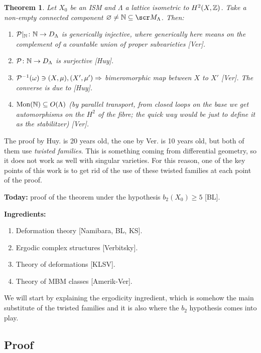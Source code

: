 \documentclass[A4paper, british, reqno]{amsart}
\theoremstyle{darkgreentheorem}
\newtheorem{thm}{Theorem}[section]
\theoremstyle{darkbluedefinition}
\theoremstyle{darkredexample}
\theoremstyle{remark}
\newcommand{\1}{\mathbbm{1}}
\newcommand{\sub}{\subseteq}
\begin{document}
\begin{thm}
    Let $X_{0}$ be an ISM and $\Lambda$ a lattice isometric to $H^{2}(X,\mathbb{Z})$.
    Take a non-empty connected component $\varnothing \neq \N\sub \M_{\Lambda}$.
    Then:
    \begin{enumerate}
	\item $\mathcal{P}|_{\mathbb{N}}\colon \mathbb{N}\to D_{\Lambda}$ is \textit{generically} injective, where generically here means on the complement of a countable union of proper subvarieties [Ver].
	\item $\mathcal{P}\colon \mathbb{N}\to D_{\Lambda}$ is surjective [Huy].
	\item $\mathcal{P}^{-1}(\omega)\ni (X,\mu),(X',\mu') \Rightarrow $ bimeromorphic map between $X$ to $X'$ [Ver].
	    The converse is due to [Huy].
	\item $\operatorname{Mon}(\N)\sub O(\Lambda)$ (by parallel transport, from closed loops on the base we get automorphisms on the $H^{2}$ of the fibre; the quick way would be just to define it as the stabilitzer) [Ver].
    \end{enumerate}
\end{thm}

The proof by Huy. is 20 years old, the one by Ver. is 10 years old, but both of them use \textit{twisted families}.
This is something coming from differential geometry, so it does not work as well with singular varieties.
For this reason, one of the key points of this work is to get rid of the use of these twisted families at each point of the proof.

\textbf{Today:} proof of the theorem under the hypothesis $b_{2}(X_{0})\geqslant 5$ [BL].

\textbf{Ingredients:}
\begin{enumerate}
    \item Deformation theory [Namibara, BL, KS].
    \item Ergodic complex structures [Verbitsky].
    \item Theory of deformations [KLSV].
    \item Theory of MBM classes [Amerik-Ver].
\end{enumerate}

We will start by explaining the ergodicity ingredient, which is somehow the main substitute of the twisted families and it is also where the $b_{2}$ hypothesis comes into play.

\subsection{Proof}
\end{document}
